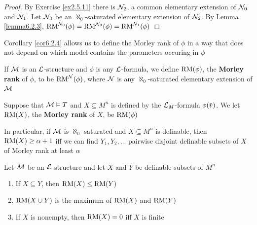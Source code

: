 \documentclass[11pt]{article}
\begin{document}
\begin{proof}
By Exercise \ref{ex2.5.11} there is \(\mathcal{N}_2\), a common elementary extension of \(\mathcal{N}_0\) and \(\mathcal{N}_1\).
Let \(\mathcal{N}_3\) be an \(\aleph_0\)-saturated elementary extension of \(\mathcal{N}_2\). By Lemma
\ref{lemma6.2.3}, \(\operatorname{RM}^{\mathcal{N}_0}(\phi)=\operatorname{RM}^{\mathcal{N}_3}(\phi)=\operatorname{RM}^{\mathcal{N}_1}(\phi)\)
\end{proof}

Corollary \ref{cor6.2.4} allows us to define the Morley rank of \(\phi\) in a way that does not depend on
which model contains the parameters occuring in \(\phi\)

\begin{definition}[]
If \(\mathcal{M}\) is an \(\mathcal{L}\)-structure and \(\phi\) is any \(\mathcal{L}\)-formula, we define \(\operatorname{RM}(\phi)\), the \textbf{Morley rank}
of \(\phi\), to be \(\operatorname{RM}^{\mathcal{N}}(\phi)\), where \(\mathcal{N}\) is any \(\aleph_0\)-saturated elementary extension of \(\mathcal{M}\)
\end{definition}

\begin{definition}[]
Suppose that \(\mathcal{M}\vDash T\) and \(X\subseteq M^n\) is defined by the \(\mathcal{L}_M\)-formula \(\phi(\barv)\). We
let \(\operatorname{RM}(X)\), the \textbf{Morley rank} of \(X\), be \(\operatorname{RM}(\phi)\)
\end{definition}

In particular, if \(\mathcal{M}\) is \(\aleph_0\)-saturated and \(X\subseteq M^n\) is definable, then \(\operatorname{RM}(X)\ge\alpha+1\) iff
we can find \(Y_1,Y_2,\dots\) pairwise disjoint definable subsets of \(X\) of Morley rank at least
\(\alpha\)

\begin{lemma}[]
\label{lemma6.2.7}
Let \(\mathcal{M}\) be an \(\mathcal{L}\)-structure and let \(X\) and \(Y\) be definable subsets of \(M^n\)
\begin{enumerate}
\item If \(X\subseteq Y\), then \(\operatorname{RM}(X)\le\operatorname{RM}(Y)\)
\item \(\operatorname{RM}(X\cup Y)\) is the maximum of \(\operatorname{RM}(X)\) and \(\operatorname{RM}(Y)\)
\item If \(X\) is nonempty, then \(\operatorname{RM}(X)=0\) iff \(X\) is finite
\end{enumerate}
\end{lemma}
\end{document}
